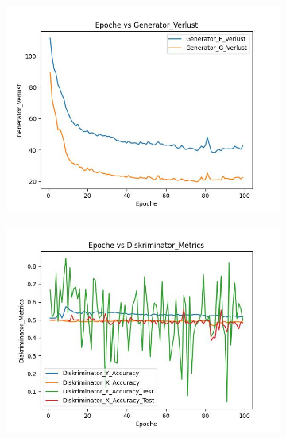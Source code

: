\begin{figure}[H]
  \begin{subfigure}[t]{.45\textwidth}
    \centering
    \includegraphics[width=\linewidth]{images/cycleGanResults/Generator_Verlust.jpg}
  \end{subfigure}
  \hfill
  \begin{subfigure}[t]{.45\textwidth}
    \centering
    \includegraphics[width=\linewidth]{images/cycleGanResults/Diskriminator_Metrics.jpg}
  \end{subfigure}
  \medskip
  \begin{subfigure}[t]{.45\textwidth}
    \centering

\end{subfigure}
\end{figure}
